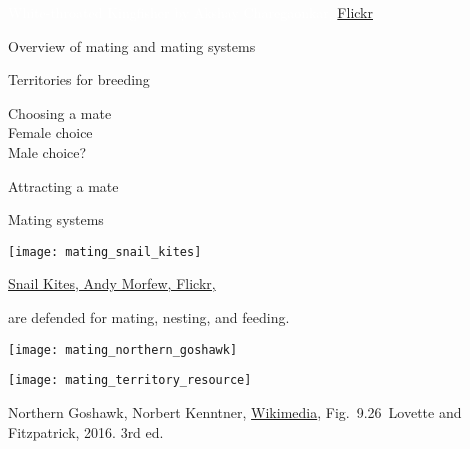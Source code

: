 \documentclass[t]{beamer}
\newcommand{\cornell}[1]{Fig.~#1~Lovette and Fitzpatrick, 2016. 3rd ed.}
\begin{document}

{
\begin{frame}[b,plain]
	
	\tinyfill \textcolor{white}{White-throated Kingfisher by Akshay Charegaonkar, \href{https://www.flickr.com/photos/27286306@N07/7616501040}{Flickr}, } 
\end{frame}
}


\begin{frame}[t]{Overview of mating and mating systems}

\begin{multicols}{2}
\hangpara Territories for breeding

\hangpara Choosing a mate\\
	\quad Female choice \\
	\quad Male choice?

\hangpara Attracting a mate

\hangpara Mating systems

\columnbreak

\noindent\texttt{[image: mating\_snail\_kites]}

\end{multicols}

\vfilll

\tinyfill \href{https://www.flickr.com/photos/66020093@N03/27898298881}{Snail Kites, Andy Morfew, Flickr, }
\end{frame}


\begin{frame}[t]{ are defended for mating, nesting, and feeding.}

\vspace{-0.5\baselineskip}
\begin{multicols}{2}
\centering
\noindent\texttt{[image: mating\_northern\_goshawk]}



\columnbreak

\noindent\texttt{[image: mating\_territory\_resource]}
\end{multicols}

\vfilll

\tiny Northern Goshawk, Norbert Kenntner, \href{https://commons.wikimedia.org/wiki/File:Northern_Goshawk_ad_M2.jpg}{Wikimedia},  \hfill \cornell{9.26}

\end{frame}
\end{document}
